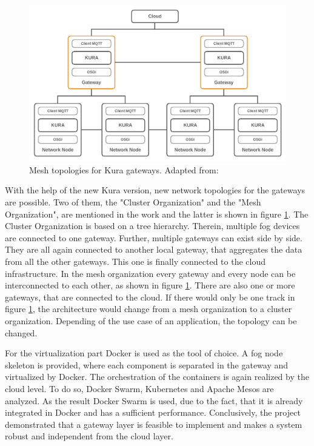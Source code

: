 \begin{figure}[H]
    \centering
    \includegraphics[width=\textwidth]{resources/images/kura_topologies.png}
    \caption[Mesh topologies for Kura gateways]{Mesh topologies for Kura gateways. Adapted from: \autocite[p. 4]{Bellavista:2017}}
    \label{fig:kura_gateway_topologies}
\end{figure}

With the help of the new Kura version, new network topologies for the gateways are possible.
Two of them, the "Cluster Organization" and the "Mesh Organization", are mentioned in the work and the latter is shown in figure \ref{fig:kura_gateway_topologies}.\autocite[cf.][p. 4]{Bellavista:2017}
The Cluster Organization is based on a tree hierarchy.
Therein, multiple fog devices are connected to one gateway.
Further, multiple gateways can exist side by side.
They are all again connected to another local gateway, that aggregates the data from all the other gateways.
This one is finally connected to the cloud infrastructure.
In the mesh organization every gateway and every node can be interconnected to each other, as shown in figure \ref{fig:kura_gateway_topologies}.
There are also one or more gateways, that are connected to the cloud.
If there would only be one track in figure \ref{fig:kura_gateway_topologies}, the architecture would change from a mesh organization to a cluster organization.
Depending of the use case of an application, the topology can be changed.

For the virtualization part \autocite{Bellavista:2017} Docker is used as the tool of choice.
A fog node skeleton is provided, where each component is separated in the gateway and virtualized by Docker.\autocite[cf.][p. 6]{Bellavista:2017}
The orchestration of the containers is again realized by the cloud level.
To do so, Docker Swarm, Kubernetes and Apache Mesos are analyzed.\autocite[cf.][p. 6 f.]{Bellavista:2017}
As the result Docker Swarm is used, due to the fact, that it is already integrated in Docker and has a sufficient performance.\autocite[cf.][p. 7]{Bellavista:2017}
Conclusively, the project demonstrated that a gateway layer is feasible to implement and makes a system robust and independent from the cloud layer.

